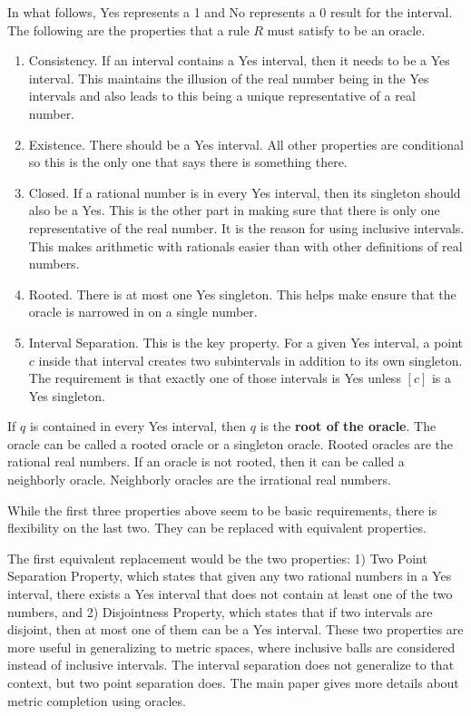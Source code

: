 \documentclass[12pt]{article}
\theoremstyle{remark}
\begin{document}
In what follows, Yes represents a 1 and No represents a 0 result for the interval. The following are the properties that a rule $R$ must satisfy to be an oracle. 

\begin{enumerate}
    \item Consistency. If an interval contains a Yes interval, then it needs to be a Yes interval. This maintains the illusion of the real number being in the Yes intervals and also leads to this being a unique representative of a real number. 
    \item Existence. There should be a Yes interval. All other properties are conditional so this is the only one that says there is something there. 
    \item Closed. If a rational number is in every Yes interval, then its singleton should also be a Yes. This is the other part in making sure that there is only one representative of the real number. It is the reason for using inclusive intervals. This makes arithmetic with rationals easier than with other definitions of real numbers.
    \item Rooted. There is at most one Yes singleton.  This helps make ensure that the oracle is narrowed in on a single number. 
    \item Interval Separation. This is the key property. For a given Yes interval, a point $c$ inside that interval creates two subintervals in addition to its own singleton. The requirement is that exactly one of those intervals is Yes unless $[c]$ is a Yes singleton. 
\end{enumerate}

If $q$ is contained in every Yes interval, then $q$ is the \textbf{root of the oracle}.  The oracle can be called a rooted oracle or a singleton oracle. Rooted oracles are the rational real numbers. If an oracle is not rooted, then it can be called a neighborly oracle. Neighborly oracles are the irrational real numbers. 

While the first three properties above seem to be basic requirements, there is flexibility on the last two. They can be replaced with equivalent properties.

The first equivalent replacement would be the two properties: 1) Two Point Separation Property, which states that given any two rational numbers in a Yes interval, there exists a Yes interval that does not contain at least one of the two numbers, and 2) Disjointness Property, which states that if two intervals are disjoint, then at most one of them can be a Yes interval. These two properties are more useful in generalizing to metric spaces, where inclusive balls are considered instead of inclusive intervals. The interval separation does not generalize to that context, but two point separation does. The main paper gives more details about metric completion using oracles. 
\end{document}
